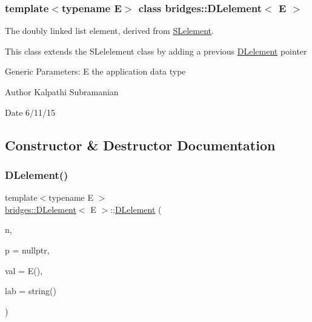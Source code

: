 \subsubsection*{template$<$typename E$>$\newline
class bridges\+::\+D\+Lelement$<$ E $>$}

The doubly linked list element, derived from \hyperlink{classbridges_1_1_s_lelement}{S\+Lelement}. 

This class extends the S\+Lelelement class by adding a previous \hyperlink{classbridges_1_1_d_lelement}{D\+Lelement} pointer

Generic Parameters\+: E the application data type

\begin{DoxyAuthor}{Author}
Kalpathi Subramanian 
\end{DoxyAuthor}
\begin{DoxyDate}{Date}
6/11/15 
\end{DoxyDate}


\subsection{Constructor \& Destructor Documentation}
\hypertarget{classbridges_1_1_d_lelement_a846424760c641ba5f496615361d8f79c}{}\label{classbridges_1_1_d_lelement_a846424760c641ba5f496615361d8f79c} 
\subsubsection{\texorpdfstring{D\+Lelement()}{DLelement()}\hspace{0.1cm}{\footnotesize\ttfamily [1/2]}}
{\footnotesize\ttfamily template$<$typename E $>$ \\
\hyperlink{classbridges_1_1_d_lelement}{bridges\+::\+D\+Lelement}$<$ E $>$\+::\hyperlink{classbridges_1_1_d_lelement}{D\+Lelement} (\begin{DoxyParamCaption}\item[{\hyperlink{classbridges_1_1_d_lelement}{D\+Lelement}$<$ E $>$ $\ast$}]{n,  }\item[{\hyperlink{classbridges_1_1_d_lelement}{D\+Lelement}$<$ E $>$ $\ast$}]{p = {\ttfamily nullptr},  }\item[{const E \&}]{val = {\ttfamily E()},  }\item[{const string \&}]{lab = {\ttfamily string()} }\end{DoxyParamCaption})\hspace{0.3cm}{\ttfamily [inline]}}

